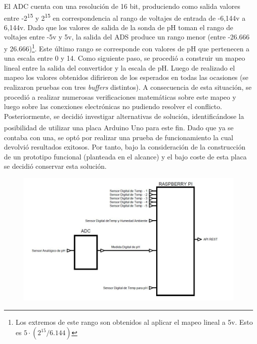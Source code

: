                 \par El ADC cuenta con una resolución de 16 bit, produciendo como salida valores entre -2\textsuperscript{15} y 2\textsuperscript{15} en correspondencia al rango de voltajes de entrada de -6,144v a 6,144v. Dado que los valores de salida de la sonda de pH toman el rango de voltajes entre -5v y 5v, la salida del ADS produce un rango menor (entre -26.666 y 26.666)\footnote{ Los extremos de este rango son obtenidos al aplicar el mapeo lineal a 5v. Esto es $ 5 \cdot (2^{15} / 6.144)$  }. Este último rango se corresponde con valores de pH que pertenecen a una escala entre 0 y 14. Como siguiente paso, se procedió a construir un mapeo lineal entre la salida del convertidor y la escala de pH. Luego de realizado el mapeo los valores obtenidos difirieron de los esperados en todas las ocasiones (se realizaron pruebas con tres \textit{buffers} distintos). A consecuencia de esta situación, se procedió a realizar numerosas verificaciones matemáticas sobre este mapeo y luego sobre las conexiones electrónicas no pudiendo resolver el conflicto. Posteriormente, se decidió investigar alternativas de solución, identificándose la posibilidad de utilizar una placa Arduino \textsuperscript{\textregistered} Uno para este fin. Dado que ya se contaba con una, se optó por realizar una prueba de funcionamiento la cual devolvió resultados exitosos. Por tanto, bajo la consideración de la construcción de un prototipo funcional (planteada en el alcance) y el bajo coste de esta placa se decidió conservar esta solución.
                
                \begin{figure}
                    \centering
                    \includegraphics[scale=0.55]{EsquemaDesigndeHardware.jpg}
                    \label{fig:EsquemaHardware}            
                \end{figure}
        
